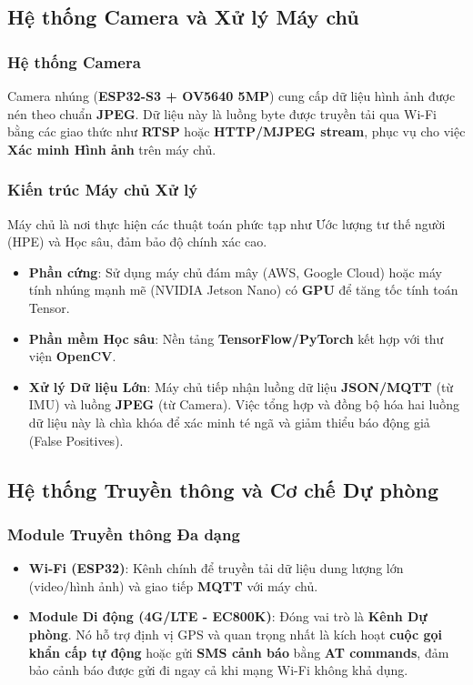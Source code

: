 \subsection{Hệ thống Camera và Xử lý Máy chủ}

\subsubsection{Hệ thống Camera}
Camera nhúng (\textbf{ESP32-S3 + OV5640 5MP}) cung cấp dữ liệu hình ảnh được nén theo chuẩn \textbf{JPEG}. Dữ liệu này là luồng byte được truyền tải qua Wi-Fi bằng các giao thức như \textbf{RTSP} hoặc \textbf{HTTP/MJPEG stream}, phục vụ cho việc \textbf{Xác minh Hình ảnh} trên máy chủ.

\subsubsection{Kiến trúc Máy chủ Xử lý}
Máy chủ là nơi thực hiện các thuật toán phức tạp như Ước lượng tư thế người (HPE) và Học sâu, đảm bảo độ chính xác cao.
\begin{itemize}
    \item \textbf{Phần cứng}: Sử dụng máy chủ đám mây (AWS, Google Cloud) hoặc máy tính nhúng mạnh mẽ (NVIDIA Jetson Nano) có \textbf{GPU} để tăng tốc tính toán Tensor.
    \item \textbf{Phần mềm Học sâu}: Nền tảng \textbf{TensorFlow/PyTorch} kết hợp với thư viện \textbf{OpenCV}.
    \item \textbf{Xử lý Dữ liệu Lớn}: Máy chủ tiếp nhận luồng dữ liệu \textbf{JSON/MQTT} (từ IMU) và luồng \textbf{JPEG} (từ Camera). Việc tổng hợp và đồng bộ hóa hai luồng dữ liệu này là chìa khóa để xác minh té ngã và giảm thiểu báo động giả (False Positives).
\end{itemize}

\subsection{Hệ thống Truyền thông và Cơ chế Dự phòng}

\subsubsection{Module Truyền thông Đa dạng}
\begin{itemize}
    \item \textbf{Wi-Fi (ESP32)}: Kênh chính để truyền tải dữ liệu dung lượng lớn (video/hình ảnh) và giao tiếp \textbf{MQTT} với máy chủ.
    \item \textbf{Module Di động (4G/LTE - EC800K)}: Đóng vai trò là \textbf{Kênh Dự phòng}. Nó hỗ trợ định vị GPS và quan trọng nhất là kích hoạt \textbf{cuộc gọi khẩn cấp tự động} hoặc gửi \textbf{SMS cảnh báo} bằng \textbf{AT commands}, đảm bảo cảnh báo được gửi đi ngay cả khi mạng Wi-Fi không khả dụng.
\end{itemize}


